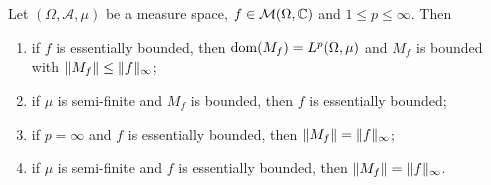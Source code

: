 \begin{proposition} \label{boundedMultiplicationOperator}
Let $(\Omega, \mathcal{A}, \mu)$ be a measure space, $f\in \operatorname{\mathcal{M}}(\Omega, \mathbb{C})$ and $1\leq p \leq \infty$. Then
\begin{enumerate}
\item if $f$ is essentially bounded, then $\operatorname{dom}(M_f) = L^p(\Omega,\mu)$ and $M_f$ is bounded with $\lVert M_f\rVert \leq \lVert f\rVert_\infty$;
\item if $\mu$ is semi-finite and $M_f$ is bounded, then $f$ is essentially bounded;
\item if $p = \infty$ and $f$ is essentially bounded, then $\lVert M_f\rVert = \lVert f\rVert_\infty$;
\item if $\mu$ is semi-finite and $f$ is essentially bounded, then $\lVert M_f\rVert = \lVert f\rVert_\infty$.
\end{enumerate}
\end{proposition}
